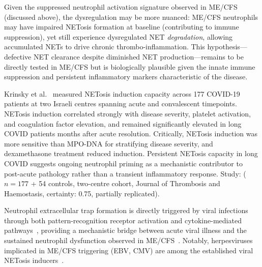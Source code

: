 Given the suppressed neutrophil activation signature observed in ME/CFS (discussed above), the dysregulation may be more nuanced: ME/CFS neutrophils may have impaired NETosis formation at baseline (contributing to immune suppression), yet still experience dysregulated NET \emph{degradation}, allowing accumulated NETs to drive chronic thrombo-inflammation. This hypothesis---defective NET clearance despite diminished NET production---remains to be directly tested in ME/CFS but is biologically plausible given the innate immune suppression and persistent inflammatory markers characteristic of the disease.

\begin{achievement}
\label{ach:krinsky2023-netosis-long-covid}
Krinsky et al.~\cite{Krinsky2023} measured NETosis induction capacity across 177 COVID-19 patients at two Israeli centres spanning acute and convalescent timepoints. NETosis induction correlated strongly with disease severity, platelet activation, and coagulation factor elevation, and remained significantly elevated in long COVID patients months after acute resolution. Critically, NETosis induction was more sensitive than MPO-DNA for stratifying disease severity, and dexamethasone treatment reduced induction. Persistent NETosis capacity in long COVID suggests ongoing neutrophil priming as a mechanistic contributor to post-acute pathology rather than a transient inflammatory response.
Study: ($n=177$ + 54 controls, two-centre cohort, Journal of Thrombosis and Haemostasis, certainty: 0.75, partially replicated).
\end{achievement}

Neutrophil extracellular trap formation is directly triggered by viral infections through both pattern-recognition receptor activation and cytokine-mediated pathways~\cite{Schonrich2016}, providing a mechanistic bridge between acute viral illness and the sustained neutrophil dysfunction observed in ME/CFS~\cite{Romano2022,Krinsky2023,Monsalve2025}. Notably, herpesviruses implicated in ME/CFS triggering (EBV, CMV) are among the established viral NETosis inducers~\cite{Schonrich2016}.

